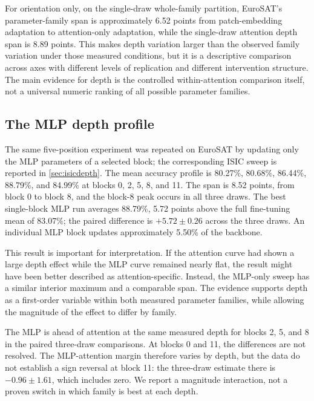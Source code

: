 \documentclass[11pt]{article}
\begin{document}
For orientation only, on the single-draw whole-family partition, EuroSAT's parameter-family span is approximately 6.52 points from patch-embedding adaptation to attention-only adaptation, while the single-draw attention depth span is 8.89 points. This makes depth variation larger than the observed family variation under those measured conditions, but it is a descriptive comparison across axes with different levels of replication and different intervention structure. The main evidence for depth is the controlled within-attention comparison itself, not a universal numeric ranking of all possible parameter families.

\subsection{The MLP depth profile}
\label{sec:mlpdepth}

The same five-position experiment was repeated on EuroSAT by updating only the MLP parameters of a selected block; the corresponding ISIC sweep is reported in \cref{sec:isicdepth}. The mean accuracy profile is 80.27\%, 80.68\%, 86.44\%, 88.79\%, and 84.99\% at blocks 0, 2, 5, 8, and 11. The span is 8.52 points, from block 0 to block 8, and the block-8 peak occurs in all three draws. The best single-block MLP run averages 88.79\%, 5.72 points above the full fine-tuning mean of 83.07\%; the paired difference is $+5.72\pm0.26$ across the three draws. An individual MLP block updates approximately 5.50\% of the backbone.

This result is important for interpretation. If the attention curve had shown a large depth effect while the MLP curve remained nearly flat, the result might have been better described as attention-specific. Instead, the MLP-only sweep has a similar interior maximum and a comparable span. The evidence supports depth as a first-order variable within both measured parameter families, while allowing the magnitude of the effect to differ by family.

The MLP is ahead of attention at the same measured depth for blocks 2, 5, and 8 in the paired three-draw comparisons. At blocks 0 and 11, the differences are not resolved. The MLP-attention margin therefore varies by depth, but the data do not establish a sign reversal at block 11: the three-draw estimate there is $-0.96\pm1.61$, which includes zero. We report a magnitude interaction, not a proven switch in which family is best at each depth.
\end{document}
